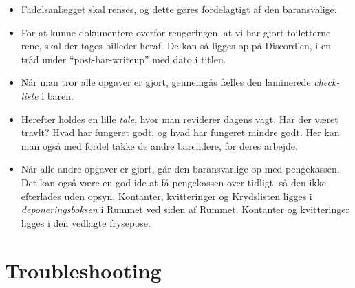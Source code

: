 \begin{itemize}
    \item Fadølsanlægget skal renses, og dette gøres fordelagtigt af den baransvalige.
    \item For at kunne dokumentere overfor rengøringen, at vi har gjort toiletterne rene,
    skal der tages billeder heraf. De kan så ligges op på Discord'en, i en tråd under
    ``post-bar-writeup'' med dato i titlen.
    \item Når man tror alle opgaver er gjort, gennemgås fælles den laminerede \textit{check-liste} i baren.
    \item Herefter holdes en lille \textit{tale}, hvor man reviderer dagens vagt. Har der været travlt?
    Hvad har fungeret godt, og hvad har fungeret mindre godt.
    Her kan man også med fordel takke de andre barendere, for deres arbejde.
    \item Når alle andre opgaver er gjort, går den baransvarlige op med pengekassen.
    Det kan også være en god ide at få pengekassen over tidligt, så den ikke efterlades uden opsyn.
    Kontanter, kvitteringer og Krydslisten ligges i \textit{deponeringsboksen} i Rummet ved
    siden af Rummet. Kontanter og kvitteringer ligges i den vedlagte frysepose.
\end{itemize}

\newpage
\section{Troubleshooting}
\label{sec:troubleshooting}

